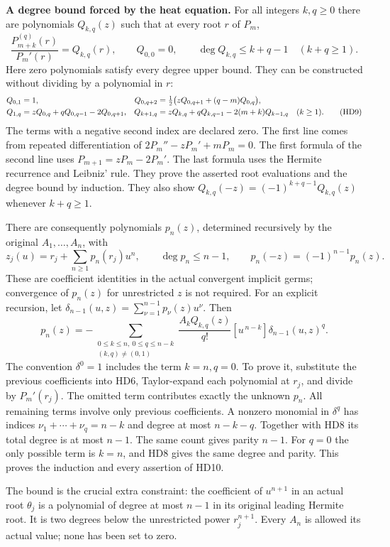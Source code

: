 \documentclass[11pt,a4paper]{article}
\theoremstyle{definition}\newtheorem{definition}[theorem]{Definition}
\begin{document}
\HD\textbf{A degree bound forced by the heat equation.}
For all integers $k,q\ge0$ there are polynomials $Q_{k,q}(z)$
such that at every root $r$ of $P_m$,
\[
 \frac{P_{m+k}^{(q)}(r)}{P_m'(r)}=Q_{k,q}(r),\qquad
 Q_{0,0}=0,\qquad
 \deg Q_{k,q}\le k+q-1\quad(k+q\ge1).
 \tag{HD8}\label{hd:Qdegree}
\]
Here zero polynomials satisfy every degree upper bound.
They can be constructed without dividing by a polynomial in $r$:
\begin{align}
 Q_{0,1}&=1,&
 Q_{0,q+2}&=\tfrac12\bigl(zQ_{0,q+1}+(q-m)Q_{0,q}\bigr),\notag\\
 Q_{1,q}&=zQ_{0,q}+qQ_{0,q-1}-2Q_{0,q+1},&
 Q_{k+1,q}&=zQ_{k,q}+qQ_{k,q-1}-2(m+k)Q_{k-1,q}\quad(k\ge1).
 \tag{HD9}\label{hd:Qrecursion}
\end{align}
The terms with a negative second index are declared zero.
The first line comes from repeated differentiation of
$2P_m''-zP_m'+mP_m=0$.
The first formula of the second line uses
$P_{m+1}=zP_m-2P_m'$.
The last formula uses the Hermite recurrence and Leibniz' rule.
They prove the asserted root evaluations and the degree bound
by induction. They also show
$Q_{k,q}(-z)=(-1)^{k+q-1}Q_{k,q}(z)$ whenever $k+q\ge1$.

There are consequently polynomials $p_n(z)$, determined recursively
by the original $A_1,\ldots,A_n$, with
\[
 z_j(u)=r_j+\sum_{n\ge1}p_n(r_j)u^n,\qquad
 \deg p_n\le n-1,\qquad
 p_n(-z)=(-1)^{n-1}p_n(z).
 \tag{HD10}\label{hd:pdegree}
\]
These are coefficient identities in the actual convergent implicit
germs; convergence of $p_n(z)$ for unrestricted $z$ is not required.
For an explicit recursion, let $\delta_{n-1}(u,z)=
\sum_{\nu=1}^{n-1}p_\nu(z)u^\nu$. Then
\[
 p_n(z)=-
 \sum_{\substack{0\le k\le n,\ 0\le q\le n-k\\(k,q)\ne(0,1)}}
 \frac{A_kQ_{k,q}(z)}{q!}
      [u^{\,n-k}]\delta_{n-1}(u,z)^q .
 \tag{HD11}\label{hd:precursion}
\]
The convention $\delta^0=1$ includes the term $k=n,q=0$.
To prove it, substitute the previous coefficients into HD6,
Taylor-expand each polynomial at $r_j$, and divide by $P_m'(r_j)$.
The omitted term contributes exactly the unknown $p_n$.
All remaining terms involve only previous coefficients.
A nonzero monomial in $\delta^q$ has indices
$\nu_1+\cdots+\nu_q=n-k$ and degree at most $n-k-q$.
Together with HD8 its total degree is at most $n-1$.
The same count gives parity $n-1$. For $q=0$ the only possible
term is $k=n$, and HD8 gives the same degree and parity.
This proves the induction and every assertion of HD10.

The bound is the crucial extra constraint: the coefficient of
$u^{n+1}$ in an actual root $\theta_j$ is a polynomial of degree
at most $n-1$ in its original leading Hermite root.
It is two degrees below the unrestricted power $r_j^{n+1}$.
Every $A_n$ is allowed its actual value; none has been set to zero.
\end{document}
